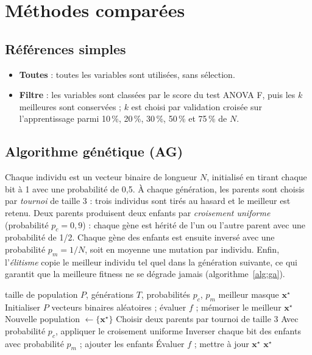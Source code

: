 \documentclass[11pt,a4paper]{report}
\begin{document}
\section{Méthodes comparées}
\subsection{Références simples}
\begin{itemize}
  \item \textbf{Toutes} : toutes les variables sont utilisées, sans sélection.
  \item \textbf{Filtre} : les variables sont classées par le score du test ANOVA F, puis les $k$
        meilleures sont conservées ; $k$ est choisi par validation croisée sur l'apprentissage
        parmi 10\,\%, 20\,\%, 30\,\%, 50\,\% et 75\,\% de $N$.
\end{itemize}

\subsection{Algorithme génétique (AG)}
Chaque individu est un vecteur binaire de longueur $N$, initialisé en tirant chaque bit à 1 avec
une probabilité de 0,5. À chaque génération, les parents sont choisis par \emph{tournoi} de
taille 3 : trois individus sont tirés au hasard et le meilleur est retenu. Deux parents
produisent deux enfants par \emph{croisement uniforme} (probabilité $p_c = 0{,}9$) : chaque gène
est hérité de l'un ou l'autre parent avec une probabilité de 1/2. Chaque gène des enfants est
ensuite inversé avec une probabilité $p_m = 1/N$, soit en moyenne une mutation par individu.
Enfin, l'\emph{élitisme} copie le meilleur individu tel quel dans la génération suivante, ce qui
garantit que la meilleure fitness ne se dégrade jamais (algorithme~\ref{alg:ga}).

\begin{algorithm}[H]
\caption{Algorithme génétique pour la sélection de variables}
\label{alg:ga}
\begin{algorithmic}[1]
\Require taille de population $P$, générations $T$, probabilités $p_c$, $p_m$
\Ensure meilleur masque $\mathbf{x}^\star$
\State Initialiser $P$ vecteurs binaires aléatoires ; évaluer $f$ ; mémoriser le meilleur $\mathbf{x}^\star$
  \State Nouvelle population $\gets \{\mathbf{x}^\star\}$ 
    \State Choisir deux parents par tournoi de taille 3
    \State Avec probabilité $p_c$, appliquer le croisement uniforme
    \State Inverser chaque bit des enfants avec probabilité $p_m$ ; ajouter les enfants
  \EndWhile
  \State Évaluer $f$ ; mettre à jour $\mathbf{x}^\star$
\EndFor
\State \Return $\mathbf{x}^\star$
\end{algorithmic}
\end{algorithm}
\end{document}
